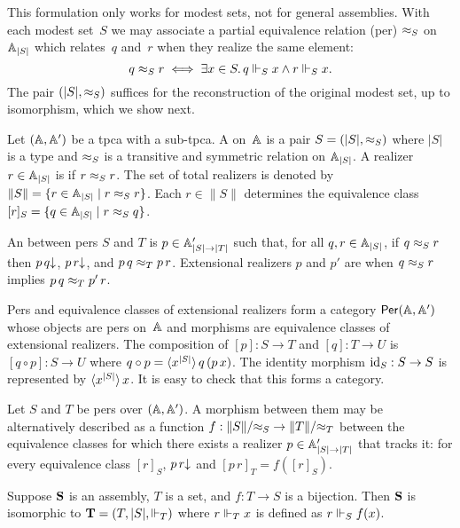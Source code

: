 This formulation only works for modest sets, not for general
assemblies. With each modest set~$S$ we may associate a partial
equivalence relation (per) $\per_S$ on
$\xAtyp{S}$ which relates~$q$ and~$r$ when they realize the same
element:
%
\begin{equation*}
  q \per_S r \iff
  \some{x \in S} q \rz_S x \land r \rz_S x.
\end{equation*}
%
The pair $(|S|, {\per_S})$ suffices for the reconstruction of the
original modest set, up to isomorphism, which we show next.

Let $(\AA, \subAA)$ be a tpca with a sub-tpca. A  on~$\AA$ is a pair $S = (|S|, {\per_S})$ where
$|S|$ is a type and $\per_S$ is a transitive and symmetric
relation on $\xAtyp{S}$. A realizer $r \in \xAtyp{S}$ is  if
$r \per_S r$. The set of total realizers is denoted by $\|S\| = \set{r
  \in \xAtyp{S} \such r \per_S r}$. Each $r \in \|S\|$ determines
the equivalence class $[r]_S = \set{q \in \xAtyp{S} \such r \per_S q}$.

An  between pers $S$ and $T$ is $p \in
\subAtyp{|S| \to |T|}$ such that, for all $q, r \in \xAtyp{S}$, if $q
\per_S r$ then $\defined{p\,q}$, $\defined{p\,r}$, and $p\,q \per_T
p\,r$. Extensional realizers $p$ and $p'$ are  when
$q \per_S r$ implies $p\,q \per_T p'\,r$.

Pers and equivalence classes of extensional realizers form a category
$\Per{\AA, \subAA}$ whose objects are pers on~$\AA$ and morphisms are
equivalence classes of extensional realizers. The composition of $[p]
: S \to T$ and $[q] : T \to U$ is $[q \circ p] : S \to U$ where $q
\circ p = \tpcalam{x}{|S|}{q\,(p\,x)}$. The identity morphism
$\id[S] : S \to S$ is represented by $\tpcalam{x}{|S|} x$. It
is easy to check that this forms a category.

Let $S$ and $T$ be pers over $(\AA, \subAA)$. A morphism between them
may be alternatively described as a function $f : \|S\|/{\per_S} \to
\|T\|/{\per_T}$ between the equivalence classes for which there exists
a realizer $p \in \subAtyp{|S| \to |T|}$ that tracks it: for every
equivalence class $[r]_S$, $\defined{p\,r}$ and $[p\,r]_T = f([r]_S)$.

\begin{lemma}
  \label{lemma:iso-assembly}
  Suppose $\asm{S}$ is an assembly, $T$ is a set, and $f : T \to S$ is
  a bijection. Then $\asm{S}$ is isomorphic to $\asm{T} = (T, |S|,
  {\rz_T})$ where $r \rz_T x$ is defined as $r \rz_S f(x)$.
\end{lemma}

